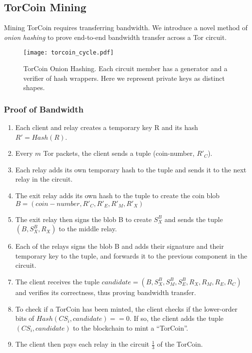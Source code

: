 \subsection{TorCoin Mining}

Mining TorCoin requires transferring bandwidth. We introduce a novel method of
\textit{onion hashing} to prove end-to-end bandwidth transfer across a Tor
circuit.

\begin{figure}[H]
  \centering
    \texttt{[image: torcoin\_cycle.pdf]}
  \caption{TorCoin Onion Hashing. Each circuit member has a generator and a 
  verifier of hash wrappers. Here we represent private keys as distinct shapes.}
\end{figure}

\subsubsection{Proof of Bandwidth}
\begin{enumerate}
\item Each client and relay creates a temporary key R and its hash $R' = Hash(R)$. 
\item Every $m$ Tor packets, the client sends a tuple (coin-number, $R'_C$).
\item Each relay adds its own temporary hash to the tuple and sends it to the next relay in the circuit.
\item The exit relay adds its own hash to the tuple to create the coin blob 
$B = (coin-number, R'_{C}, R'_{E}, R'_{M}, R'_{X})$ 
\item The exit relay then signs the blob B to create $S^B_X$ and sends the tuple $(B, S^B_X, R_X)$ to the middle relay.
\item Each of the relays signs the blob B and adds their signature and their temporary key to the tuple, and forwards it to the previous component in the circuit. 
\item The client receives the tuple $candidate = (B, S^B_X, S^B_M, S^B_E, R_X, R_M, R_E, R_C)$ and verifies its correctness, thus proving bandwidth transfer.
\item To check if a TorCoin has been minted, the client checks if the lower-order bits of $Hash(CS_i, candidate) == 0$. If so, the client adds the tuple $(CS_i, candidate)$ to the blockchain to mint a ``TorCoin''.
\item The client then pays each relay in the circuit $\frac{1}{3}$ of the TorCoin. 
\end{enumerate}

